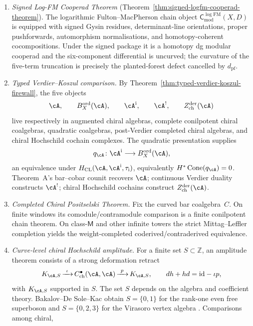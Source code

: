 \begin{theorem}
\begin{enumerate}[label=\textup{(\Roman*)}]
\item \emph{Signed Log-FM Cooperad Theorem}
\textup{(}Theorem~\ref{thm:signed-logfm-cooperad-theorem}\textup{).}
The logarithmic
Fulton--MacPherson chain object
\(\mathsf C^{\log\mathrm{FM}}_{\mathrm{mod}}(X,D)\) is equipped with
signed Gysin residues, determinant-line orientations, proper
pushforwards, automorphism normalisations, and homotopy-coherent
cocompositions.  Under the signed package it is a homotopy dg modular
cooperad and the six-component differential is uncurved; the curvature
of the five-term truncation is precisely the planted-forest defect
cancelled by \(d_{\mathrm{pf}}\).
\item \emph{Typed Verdier--Koszul comparison.}  By
Theorem~\ref{thm:typed-verdier-koszul-firewall}, the five objects
\[
\cA,\qquad B_X^{\mathrm{ord}}(\cA),\qquad
\cA^{\mathrm i},\qquad
\cA^!,\qquad Z^{\mathrm{der}}_{\mathrm{ch}}(\cA)
\]
live respectively in augmented chiral algebras, complete conilpotent
chiral coalgebras, quadratic coalgebras, post-Verdier completed
chiral algebras, and chiral Hochschild cochain complexes.  The
quadratic presentation supplies
\[
q_\cA\colon\cA^{\mathrm i}\longrightarrow
B_X^{\mathrm{ord}}(\cA),
\]
an equivalence under
\(H_{\mathrm{CL}}(\cA,\cA^{\mathrm i},\tau_{\mathrm i})\), equivalently
\(H^*\operatorname{Cone}(q_\cA)=0\).  Theorem~A's bar--cobar counit
recovers \(\cA\); continuous Verdier duality constructs \(\cA^!\);
chiral Hochschild cochains construct
\(Z^{\mathrm{der}}_{\mathrm{ch}}(\cA)\).
\item \emph{Completed Chiral Positselski Theorem.}  Fix the curved bar
coalgebra~\(C\).  On finite windows its comodule/contramodule comparison
is a finite conilpotent chain theorem.  On class-\(\mathsf M\) and
other infinite towers the strict Mittag--Leffler completion yields the
weight-completed coderived/contraderived equivalence.
\item \emph{Curve-level chiral Hochschild amplitude.}  For a finite
set \(S\subset\mathbb Z\), an amplitude theorem consists of a strong
deformation retract
\[
K_{\cA,S}\mathop{\xrightarrow{\ \iota\ }}C^\bullet_{\mathrm{ch}}(\cA,\cA)
\mathop{\xrightarrow{\ p\ }}K_{\cA,S},
\qquad
dh+hd=\mathrm{id}-\iota p,
\]
with \(K_{\cA,S}\) supported in \(S\).  The set \(S\) depends on the
algebra and coefficient theory.  Bakalov--De Sole--Kac obtain
\(S=\{0,1\}\) for the rank-one even free superboson and
\(S=\{0,2,3\}\) for the Virasoro vertex algebra
\cite[Theorems~7.4 and~7.2]{BDSK21}.  Comparisons among chiral,

\end{enumerate}
\end{theorem}
